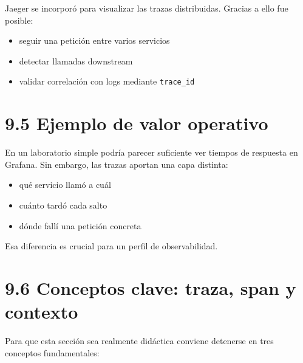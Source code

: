 \documentclass[
a4paper,
12pt]{report}
\providecommand{\tightlist}{%
  \setlength{\itemsep}{0pt}\setlength{\parskip}{0pt}}
\begin{document}
Jaeger se incorporó para visualizar las trazas distribuidas. Gracias a
ello fue posible:

\begin{itemize}
\tightlist
\item
  seguir una petición entre varios servicios
\item
  detectar llamadas downstream
\item
  validar correlación con logs mediante \texttt{trace\_id}
\end{itemize}

\section{9.5 Ejemplo de valor
operativo}\label{ejemplo-de-valor-operativo}

En un laboratorio simple podría parecer suficiente ver tiempos de
respuesta en Grafana. Sin embargo, las trazas aportan una capa distinta:

\begin{itemize}
\tightlist
\item
  qué servicio llamó a cuál
\item
  cuánto tardó cada salto
\item
  dónde fallí una petición concreta
\end{itemize}

Esa diferencia es crucial para un perfil de observabilidad.

\section{9.6 Conceptos clave: traza, span y
contexto}\label{conceptos-clave-traza-span-y-contexto}

Para que esta sección sea realmente didáctica conviene detenerse en tres
conceptos fundamentales:
\end{document}
